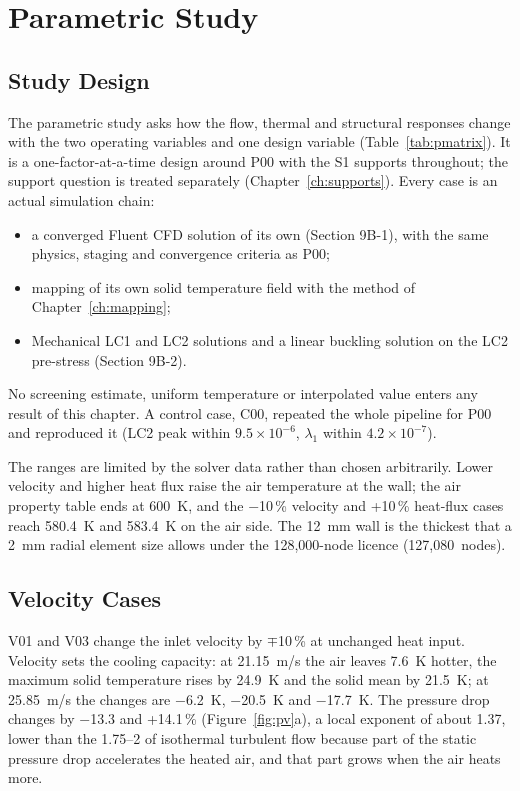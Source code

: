 \chapter{Parametric Study}\label{ch:param}

\section{Study Design}
The parametric study asks how the flow, thermal and structural responses change with the two operating variables and one design variable
(Table~\ref{tab:pmatrix}). It is a one-factor-at-a-time design around P00 with the S1 supports throughout; the support question is treated
separately (Chapter~\ref{ch:supports}). Every case is an actual simulation chain:
\begin{itemize}
\item a converged Fluent CFD solution of its own (Section 9B-1), with the same physics, staging and convergence criteria as P00;
\item mapping of its own solid temperature field with the method of Chapter~\ref{ch:mapping};
\item Mechanical LC1 and LC2 solutions and a linear buckling solution on the LC2 pre-stress (Section 9B-2).
\end{itemize}
No screening estimate, uniform temperature or interpolated value enters any result of this chapter. A control case, C00, repeated the whole
pipeline for P00 and reproduced it (LC2 peak within $9.5\times10^{-6}$, $\lambda_1$ within $4.2\times10^{-7}$).



The ranges are limited by the solver data rather than chosen arbitrarily. Lower velocity and higher heat flux raise the air temperature at
the wall; the air property table ends at 600~K, and the $-$10\,\% velocity and +10\,\% heat-flux cases reach 580.4~K and 583.4~K on the air side.
The 12~mm wall is the thickest that a 2~mm radial element size allows under the 128,000-node licence (127,080~nodes).

\section{Velocity Cases}
V01 and V03 change the inlet velocity by $\mp$10\,\% at unchanged heat input. Velocity sets the cooling capacity: at 21.15~m/s the air leaves
7.6~K hotter, the maximum solid temperature rises by 24.9~K and the solid mean by 21.5~K; at 25.85~m/s the changes are $-$6.2~K, $-$20.5~K and
$-$17.7~K. The pressure drop changes by $-$13.3 and +14.1\,\% (Figure~\ref{fig:pv}a), a local exponent of about 1.37, lower than the
1.75--2 of isothermal turbulent flow because part of the static pressure drop accelerates the heated air, and that part grows when the air
heats more.

